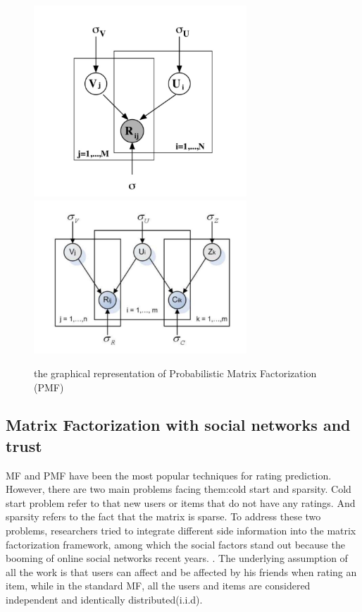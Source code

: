 \documentclass[10pt,onecolumn,conference]{IEEEtran}
\begin{document}
\begin{figure}[h]
	\caption{the graphical representation of Probabilistic Matrix Factorization (PMF)}
	\centering
	\includegraphics[width=8cm]{pmf}
	\includegraphics[width=8cm]{sorec}
\end{figure}

\subsection{Matrix Factorization with social networks and trust}
MF and PMF have been the most popular techniques for rating prediction. However, there are two main problems facing them:cold start and sparsity. Cold start problem refer to that new users or items that do not have any ratings. And sparsity refers to the fact that the matrix is sparse. To address these two problems, researchers tried to integrate different side information into the matrix factorization framework, among which the social factors stand out because the booming of online social networks recent years. \cite{jamali2010matrix}\cite{ma2009llearningEnsembel}\cite{ma2009learningTrust}\cite{ma2008sorec}\cite{ma2011recommender}\cite{massa2004trust}\cite{yang2013social}. The underlying assumption of all the work is that users can affect and be affected by his friends when rating an item, while in the standard MF, all the users and items are considered independent and identically distributed(i.i.d).
\end{document}
